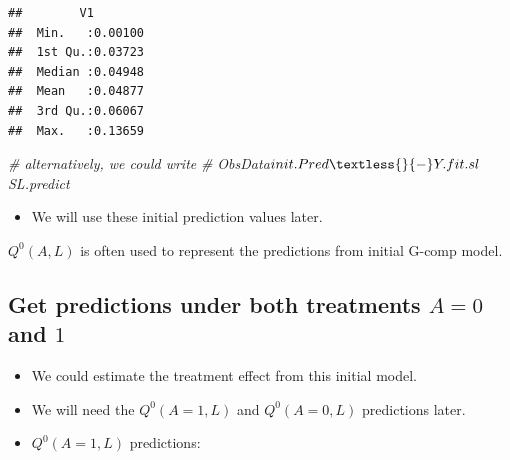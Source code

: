 \documentclass[
]{book}
\newenvironment{Shaded}{\begin{snugshade}}{\end{snugshade}}
\newcommand{\AttributeTok}[1]{\textcolor[rgb]{0.77,0.63,0.00}{#1}}
\newcommand{\CommentTok}[1]{\textcolor[rgb]{0.56,0.35,0.01}{\textit{#1}}}
\newcommand{\FunctionTok}[1]{\textcolor[rgb]{0.00,0.00,0.00}{#1}}
\newcommand{\NormalTok}[1]{#1}
\newcommand{\OtherTok}[1]{\textcolor[rgb]{0.56,0.35,0.01}{#1}}
\newcommand{\SpecialCharTok}[1]{\textcolor[rgb]{0.00,0.00,0.00}{#1}}
\newcommand{\StringTok}[1]{\textcolor[rgb]{0.31,0.60,0.02}{#1}}
\providecommand{\tightlist}{%
  \setlength{\itemsep}{0pt}\setlength{\parskip}{0pt}}
\begin{document}
\begin{Shaded}
\end{Shaded}

\begin{verbatim}
##        V1         
##  Min.   :0.00100  
##  1st Qu.:0.03723  
##  Median :0.04948  
##  Mean   :0.04877  
##  3rd Qu.:0.06067  
##  Max.   :0.13659
\end{verbatim}

\begin{Shaded}
\begin{Highlighting}[]
\CommentTok{\# alternatively, we could write}
\CommentTok{\# ObsData$init.Pred \textless{}{-} Y.fit.sl$SL.predict}
\end{Highlighting}
\end{Shaded}

\begin{itemize}
\tightlist
\item
  We will use these initial prediction values later.
\end{itemize}

\begin{rmdcomment}
\(Q^0(A,L)\) is often used to represent the predictions from initial
G-comp model.
\end{rmdcomment}

\hypertarget{get-predictions-under-both-treatments-a-0-and-1}{%
\subsection{\texorpdfstring{Get predictions under both treatments \(A = 0\) and \(1\)}{Get predictions under both treatments A = 0 and 1}}\label{get-predictions-under-both-treatments-a-0-and-1}}

\begin{itemize}
\tightlist
\item
  We could estimate the treatment effect from this initial model.
\item
  We will need the \(Q^0(A=1,L)\) and \(Q^0(A=0,L)\) predictions later.
\item
  \(Q^0(A=1,L)\) predictions:
\end{itemize}
\end{document}
